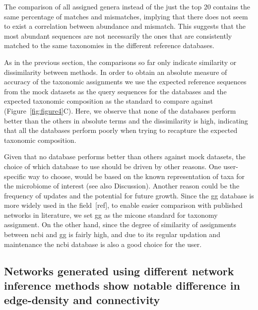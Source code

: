   The comparison of all assigned genera instead of the just the top 20 contains the same percentage of matches and mismatches, implying that there does not seem to exist a correlation between abundance and mismatch.
  This suggests that the most abundant sequences are not necessarily the ones that are consistently matched to the same taxonomies in the different reference databases.

  As in the previous section, the comparisons so far only indicate similarity or dissimilarity between methods.
  In order to obtain an absolute measure of accuracy of the taxonomic assignments we use the expected reference sequences from the mock datasets as the query sequences for the databases and the expected taxonomic composition as the standard to compare against (Figure~\ref{fig:figure4}C).
  Here, we observe that none of the databases perform better than the others in absolute terms and the dissimilarity is high, indicating that all the databases perform poorly when trying to recapture the expected taxonomic composition.

  Given that no database performs better than others against mock datasets, the choice of which database to use should be driven by other reasons.
  One user-specific way to choose, would be based on the known representation of taxa for the microbiome of interest (see also Discussion). Another reason could be the frequency of updates and the potential for future growth.
  Since the \ac{gg} database is more widely used in the field~[ref], to enable easier comparison with published networks in literature, we set \ac{gg} as the \ac{micone} standard for taxonomy assignment.
  On the other hand, since the degree of similarity of assignments between \ac{ncbi} and \ac{gg} is fairly high, and due to its regular updation and maintenance the \ac{ncbi} database is also a good choice for the user.


  \FloatBarrier

  \subsection*{Networks generated using different network inference methods show notable difference in edge-density and connectivity}

